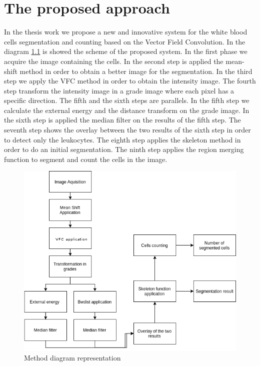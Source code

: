 \chapter{The proposed approach}
In the thesis work we propose a new and innovative system for the white blood cells segmentation and counting based on the Vector Field Convolution.
\bigskip
In the diagram \ref{fig:diag} is showed the scheme of the proposed system.
\bigskip
In the first phase we acquire the image containing the cells. In the second step is applied the mean-shift method in order to obtain a better image for the segmentation. In the third step we apply the VFC method in order to obtain the intensity image. The fourth step transform the intensity image in a grade image where each pixel has a specific direction. The fifth and the sixth steps are parallels. In the fifth step we calculate the external energy and the  distance transform on the grade image. In the sixth step is applied the median filter on the results of the fifth step. The seventh step shows the overlay between the two results of the sixth step in order to detect only the leukocytes. The eighth step applies the skeleton method in order to do an initial segmentation. The ninth step applies the region merging function to segment and count the cells in the image. 
\begin{figure}
	\begin{center}
		\centering
		\includegraphics[scale=0.5]{img/diag.png}
		\caption{Method diagram representation}
		\label{fig:diag}
	\end{center}
\end{figure}

